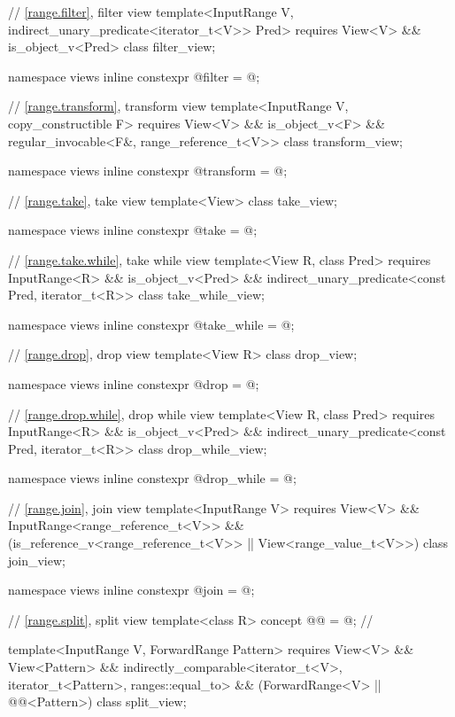 \begin{codeblock}
{  // \ref{range.filter}, filter view
  template<InputRange V, indirect_unary_predicate<iterator_t<V>> Pred>
    requires View<V> && is_object_v<Pred>
  class filter_view;

  namespace views { inline constexpr @\unspec@ filter = @\unspec@; }

  // \ref{range.transform}, transform view
  template<InputRange V, copy_constructible F>
    requires View<V> && is_object_v<F> &&
             regular_invocable<F&, range_reference_t<V>>
  class transform_view;

  namespace views { inline constexpr @\unspec@ transform = @\unspec@; }

  // \ref{range.take}, take view
  template<View> class take_view;

  namespace views { inline constexpr @\unspec@ take = @\unspec@; }

  // \ref{range.take.while}, take while view
  template<View R, class Pred>
    requires InputRange<R> && is_object_v<Pred> &&
      indirect_unary_predicate<const Pred, iterator_t<R>>
    class take_while_view;

  namespace views { inline constexpr @\unspec@ take_while = @\unspec@; }

  // \ref{range.drop}, drop view
  template<View R>
    class drop_view;

  namespace views { inline constexpr @\unspec@ drop = @\unspec@; }

  // \ref{range.drop.while}, drop while view
  template<View R, class Pred>
    requires InputRange<R> && is_object_v<Pred> &&
      indirect_unary_predicate<const Pred, iterator_t<R>>
    class drop_while_view;

  namespace views { inline constexpr @\unspec@ drop_while = @\unspec@; }

  // \ref{range.join}, join view
  template<InputRange V>
    requires View<V> && InputRange<range_reference_t<V>> &&
             (is_reference_v<range_reference_t<V>> ||
              View<range_value_t<V>>)
  class join_view;

  namespace views { inline constexpr @\unspec@ join = @\unspec@; }

  // \ref{range.split}, split view
  template<class R>
    concept @@ = @\seebelow@;   // \expos

  template<InputRange V, ForwardRange Pattern>
    requires View<V> && View<Pattern> &&
             indirectly_comparable<iterator_t<V>, iterator_t<Pattern>, ranges::equal_to> &&
             (ForwardRange<V> || @@<Pattern>)
  class split_view;

}
\end{codeblock}
